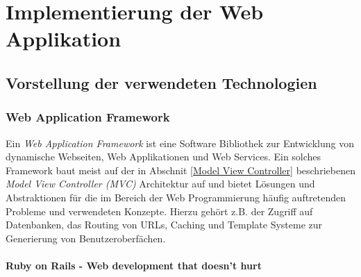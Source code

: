 \chapter{Implementierung der Web Applikation}

\section{Vorstellung der verwendeten Technologien}

\subsection{Web Application Framework}

Ein \textit{Web Application Framework} ist eine Software Bibliothek
zur Entwicklung von dynamische Webseiten, Web Applikationen und Web
Services. Ein solches Framework baut meist auf der in Abschnit
\ref{Model View Controller} beschriebenen \textit{Model View
  Controller (MVC)} 
Architektur auf und bietet Lösungen und Abstraktionen für die im
Bereich der Web Programmierung häufig auftretenden Probleme und
verwendeten Konzepte. Hierzu gehört z.B. der Zugriff auf Datenbanken,
das Routing von URLs, Caching und Template Systeme zur Generierung von
Benutzeroberfächen.

\subsubsection{Ruby on Rails - Web development that doesn't hurt}

